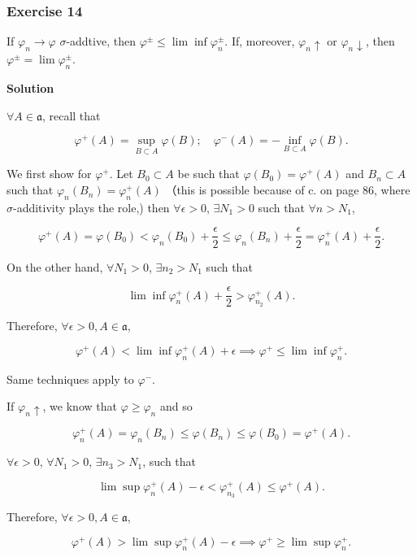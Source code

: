 \documentclass[
]{article}
\begin{document}
\hypertarget{exercise-14}{%
  \subsubsection{Exercise 14}\label{exercise-14}}

If \(\varphi_n \rightarrow \varphi\) \(\sigma\)-addtive, then
\(\varphi ^\pm \le \lim \inf \varphi_n ^\pm\). If, moreover,
\(\varphi_n \uparrow\) or \(\varphi_n \downarrow\), then
\(\varphi^{ \pm}=\lim \varphi_n ^\pm\).

\textbf{Solution}

\(\forall A \in \mathfrak a\), recall that

\[\varphi^+(A) = \sup_{B\subset A}\varphi(B); \quad \varphi^-(A) = -\inf_{B\subset A} \varphi(B).\]

We first show for \(\varphi^+\). Let \(B_0 \subset A\) be such that
\(\varphi(B_0) = \varphi^+(A)\) and \(B_n \subset A\) such that
\(\varphi_n(B_n) = \varphi_n^+(A)\) （this is possible because of c. on
page 86, where \(\sigma\)-additivity plays the role,) then
\(\forall \epsilon > 0\), \(\exists N_1 > 0\) such that
\(\forall n > N_1\),

\[\varphi^+(A) = \varphi(B_0) < \varphi_n(B_0) + \frac{\epsilon}{2} \le \varphi_n(B_n)+ \frac{\epsilon}{2} = \varphi_n^+(A)+ \frac{\epsilon}{2}.\]

On the other hand, \(\forall N_1 > 0\), \(\exists n_2 > N_1\) such that

\[\lim\inf \varphi_{n}^+(A) + \frac{\epsilon}{2} > \varphi_{n_2}^+(A).\]

Therefore, \(\forall \epsilon > 0, A\in \mathfrak a\),

\[\varphi^+(A) < \lim\inf\varphi_n^+(A) + \epsilon \implies \varphi^+ \le \lim\inf \varphi^+_n.\]

Same techniques apply to \(\varphi^-\).

If \(\varphi_n\uparrow\), we know that \(\varphi \ge \varphi_n\) and so

\[\varphi^+_n(A) = \varphi_n(B_n) \le \varphi(B_n) \le \varphi(B_0) = \varphi^+(A).\]

\(\forall \epsilon > 0\), \(\forall N_1 > 0\), \(\exists n_3 > N_1\),
such that

\[\lim\sup \varphi_n^+(A) - \epsilon < \varphi_{n_3}^+(A)\le \varphi^+(A).\]

Therefore, \(\forall \epsilon > 0, A\in \mathfrak a\),

\[\varphi^+(A) > \lim\sup\varphi_n^+(A)  - \epsilon \implies \varphi^+ \ge \lim\sup\varphi_n^+.\]
\end{document}

